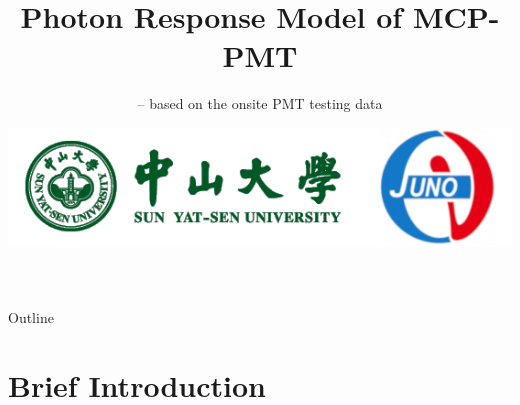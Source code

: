 \documentclass[11pt,compress,xcolor=x11names,UTF8]{beamer}
\title{Photon Response Model of MCP-PMT}
\subtitle{-- based on the onsite PMT testing data}
\author[Rong Zhao & ]{Email：zhaor25@mail2.sysu.edu.cn \and  } %
\institute[SYSU]{School of Physics\and } %
\date[\today]{\includegraphics[width=.5\textwidth]{logo}}
\begin{document}
\maketitle

\begin{frame}{Outline}
\tableofcontents
\end{frame}

\section{Brief Introduction}

\end{document}
